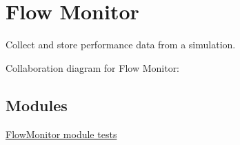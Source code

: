 \hypertarget{group__flow-monitor}{}\section{Flow Monitor}
\label{group__flow-monitor}


Collect and store performance data from a simulation.  


Collaboration diagram for Flow Monitor\+:
\subsection*{Modules}
\begin{DoxyCompactItemize}
\item 
\hyperlink{group__flow-monitor-test}{Flow\+Monitor module tests}
\end{DoxyCompactItemize}
